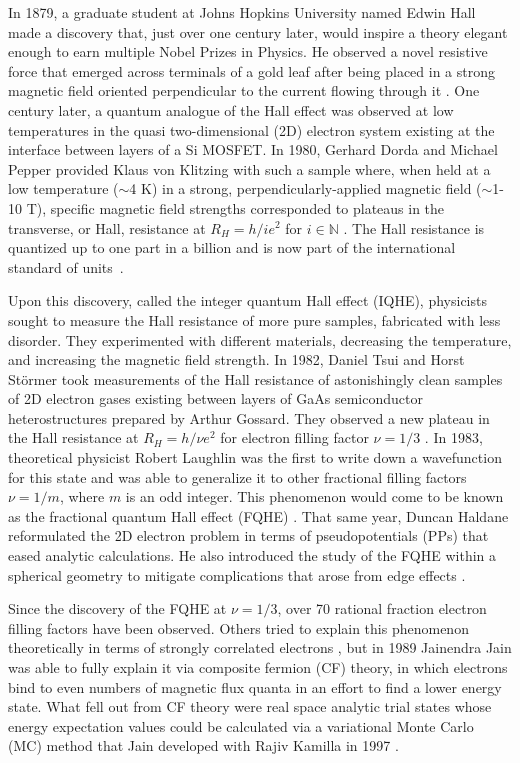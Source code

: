 \doublespacing

In 1879, a graduate student at Johns Hopkins University named Edwin Hall made a discovery that, just over one century later, would inspire a theory elegant enough to earn multiple Nobel Prizes in Physics.  He observed a novel resistive force that emerged across terminals of a gold leaf after being placed in a strong magnetic field oriented perpendicular to the current flowing through it \cite{hall}. One century later, a quantum analogue of the Hall effect was observed at low temperatures in the quasi two-dimensional (2D) electron system existing at the interface between layers of a Si MOSFET. In 1980, Gerhard Dorda and Michael Pepper provided Klaus von Klitzing with such a sample where, when held at a low temperature ($\sim$4 K) in a strong, perpendicularly-applied magnetic field ($\sim$1-10 T), specific magnetic field strengths corresponded to plateaus in the transverse, or Hall, resistance at $R_H=h/ie^2$ for $i\in\mathbb{N}$ \cite{klitzing}. The Hall resistance is quantized up to one part in a billion and is now part of the international standard of units~\cite{klitzing2017}. 

Upon this discovery, called the integer quantum Hall effect (IQHE), physicists sought to measure the Hall resistance of more pure samples, fabricated with less disorder. They experimented with different materials, decreasing the temperature, and increasing the magnetic field strength. In 1982, Daniel Tsui and Horst St\"{o}rmer took measurements of the Hall resistance of astonishingly clean samples of 2D electron gases existing between layers of GaAs semiconductor heterostructures prepared by Arthur Gossard. They observed a new plateau in the Hall resistance at $R_H=h/\nu e^2$ for electron filling factor $\nu=1/3$ \cite{tsui}. In 1983, theoretical physicist Robert Laughlin was the first to write down a wavefunction for this state and was able to generalize it to other fractional filling factors $\nu=1/m$, where $m$ is an odd integer. This phenomenon would come to be known as the fractional quantum Hall effect (FQHE) \cite{laughlin}. That same year, Duncan Haldane reformulated the 2D electron problem in terms of pseudopotentials (PPs) that eased analytic calculations. He also introduced the study of the FQHE within a spherical geometry to mitigate complications that arose from edge effects \cite{haldane}. 

Since the discovery of the FQHE at $\nu=1/3$, over 70 rational fraction electron filling factors have been observed. Others tried to explain this phenomenon theoretically in terms of strongly correlated electrons \cite{morf}, but in 1989 Jainendra Jain was able to fully explain it via composite fermion (CF) theory, in which electrons bind to even numbers of magnetic flux quanta in an effort to find a lower energy state. What fell out from CF theory were real space analytic trial states whose energy expectation values could be calculated via a variational Monte Carlo (MC) method that Jain developed with Rajiv Kamilla in 1997 \cite{bible}.

